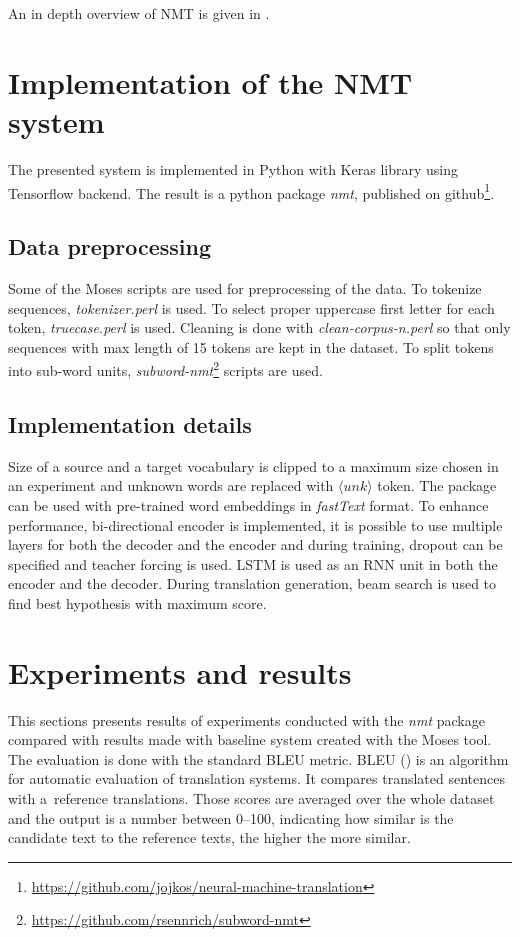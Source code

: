 \documentclass{ExcelAtFIT}
\begin{document}
An in depth overview of NMT is given in \cite{nmtTutorial}.

\section{Implementation of the NMT system}
The presented system is implemented in Python with Keras library using Tensorflow backend. The result is a python package \emph{nmt}, published on github\footnote{\url{https://github.com/jojkos/neural-machine-translation}}.

\subsection{Data preprocessing}
Some of the Moses scripts are used for preprocessing of the data. To tokenize sequences, \emph{tokenizer.perl} is used. To select proper uppercase first letter for each token, \emph{truecase.perl} is used. Cleaning is done with \emph{clean-corpus-n.perl} so that only sequences with max length of 15 tokens are kept in the dataset. To split tokens into sub-word units, \emph{subword-nmt}\footnote{\url{https://github.com/rsennrich/subword-nmt}} scripts are used.

\subsection{Implementation details}
Size of a source and a target vocabulary is clipped to a maximum size chosen in an experiment and unknown words are replaced with $\langle unk \rangle$ token. The package can be used with pre-trained word embeddings in \emph{fastText}\cite{fasttext} format. To enhance performance, bi-directional encoder is implemented, it is possible to use multiple layers for both the decoder and the encoder and during training, dropout can be specified and teacher forcing is used. LSTM is used as an RNN unit in both the encoder and the decoder. During translation generation, beam search is used to find best hypothesis with maximum score.


\section{Experiments and results}
This sections presents results of experiments conducted with the \emph{nmt} package compared with results made with baseline system created with the Moses tool. The evaluation is done with the standard BLEU metric. BLEU (\cite{BLEU}) is an algorithm for automatic evaluation of translation systems. It compares translated sentences with a~reference translations. Those scores are averaged over the whole dataset and the output is a number between 0--100, indicating how similar is the candidate text to the reference texts, the higher the more similar.
\end{document}
